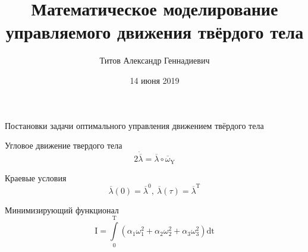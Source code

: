\documentclass[10pt,utf8,presentation,notheorems,xcolor=dvipsnames,compress]{beamer}
\title[Мат. моделир. управления]{Математическое моделирование управляемого движения твёрдого тела}
\author[Титов А. Г.]{Титов Александр Геннадиевич}
\institute[01.03.02]{«Прикладная математика и информатика»}
\date{14 июня 2019}
\begin{document}

\begin{frame}
\titlepage
\end{frame}

\begin{frame}[t]{Постановки задачи оптимального управления движением твёрдого тела} \vspace{4pt}
\begin{block}{Угловое движение твердого тела}
\begin{equation}
2\dot{\overline{\lambda}} = \overline{\lambda} \circ \overline{\omega}_\text{Y}
\end{equation}
\end{block}

\begin{block}{Краевые условия}
\begin{equation}
\overline{\lambda}(0) = \overline{\lambda}^{0},\ \overline{\lambda}(\tau) = \overline{\lambda}^\text{T}
\end{equation}
\end{block}
\begin{block}{Минимизирующий функционал}
\begin{equation}
\text{I} = \int \limits_{0}^\text{T} (\alpha_{1}\omega_{1}^{2}+\alpha_{2}\omega_{2}^{2}+\alpha_{3}\omega_{3}^{2}) \text{dt}
\end{equation}
\end{block}
\end{frame}
\end{document}
